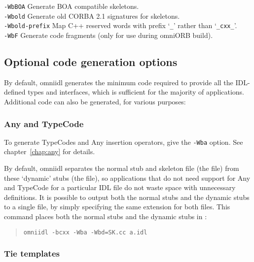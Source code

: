 \documentclass[11pt,oneside,a4paper]{book}
\newcommand{\code}[1]{\texttt{#1}}
\newcommand{\cmdline}[1]{\texttt{#1}}
\begin{document}
\begin{tabbing}
\cmdline{-WbBOA}
     \> Generate BOA compatible skeletons.\\

\cmdline{-Wbold}
     \> Generate old CORBA 2.1 signatures for skeletons.\\

\cmdline{-Wbold-prefix}
     \> Map C++ reserved words with prefix `\code{\_}' rather than
        `\code{\_cxx\_}'.\\

\cmdline{-WbF}
     \> Generate code fragments (only for use during omniORB build).\\

\end{tabbing}


\subsection{Optional code generation options}

By default, omniidl generates the minimum code required to provide all
the IDL-defined types and interfaces, which is sufficient for the
majority of applications. Additional code can also be generated, for
various purposes:


\subsubsection{Any and TypeCode}

To generate TypeCodes and Any insertion operators, give the
\cmdline{-Wba} option. See chapter~\ref{chap:any} for details.

By default, omniidl separates the normal stub and skeleton file (the
 file) from these `dynamic' stubs (the 
file), so applications that do not need support for Any and TypeCode
for a particular IDL file do not waste space with unnecessary
definitions. It is possible to output both the normal stubs and the
dynamic stubs to a single file, by simply specifying the same
extension for both files. This command places both the normal stubs
and the dynamic stubs in :

\begin{quote}
\cmdline{omniidl -bcxx -Wba -Wbd=SK.cc a.idl}
\end{quote}


\subsubsection{Tie templates}
\end{document}
